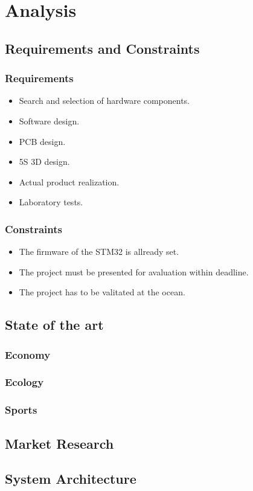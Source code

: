 \chapter{Analysis}
\section{Requirements and Constraints}
\subsection{Requirements}
\begin{itemize}
    \item Search and selection of hardware components.
    \item Software design.
    \item PCB design.
    \item 5S 3D design.
    \item Actual product realization.
    \item Laboratory tests.
\end{itemize}
\subsection{Constraints}
\begin{itemize}
    \item The firmware of the STM32 is allready set.
    \item The project must be presented for avaluation within deadline.
    \item The project has to be valitated at the ocean.
\end{itemize}
\section{State of the art}
\subsection{Economy}
\subsection{Ecology}
\subsection{Sports}
\section{Market Research}
\section{System Architecture}